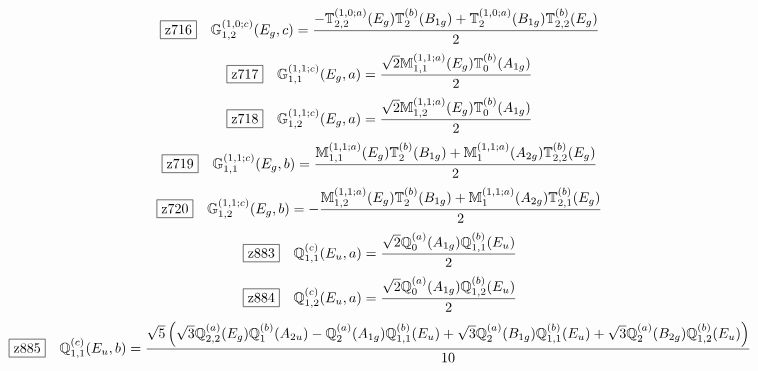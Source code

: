 \documentclass[fleqn,10pt,landscape]{jsarticle}
\begin{document}
\begin{dmath*}
\hspace*{3mm}\fbox{z716}\quad \mathbb{G}_{1,2}^{(1,0;c)}(E_{g},c)=\frac{- \mathbb{T}_{2,2}^{(1,0;a)}(E_{g}) \mathbb{T}_{2}^{(b)}(B_{1g}) + \mathbb{T}_{2}^{(1,0;a)}(B_{1g}) \mathbb{T}_{2,2}^{(b)}(E_{g})}{2}
\end{dmath*}
\begin{dmath*}
\hspace*{3mm}\fbox{z717}\quad \mathbb{G}_{1,1}^{(1,1;c)}(E_{g},a)=\frac{\sqrt{2} \mathbb{M}_{1,1}^{(1,1;a)}(E_{g}) \mathbb{T}_{0}^{(b)}(A_{1g})}{2}
\end{dmath*}
\begin{dmath*}
\hspace*{3mm}\fbox{z718}\quad \mathbb{G}_{1,2}^{(1,1;c)}(E_{g},a)=\frac{\sqrt{2} \mathbb{M}_{1,2}^{(1,1;a)}(E_{g}) \mathbb{T}_{0}^{(b)}(A_{1g})}{2}
\end{dmath*}
\begin{dmath*}
\hspace*{3mm}\fbox{z719}\quad \mathbb{G}_{1,1}^{(1,1;c)}(E_{g},b)=\frac{\mathbb{M}_{1,1}^{(1,1;a)}(E_{g}) \mathbb{T}_{2}^{(b)}(B_{1g}) + \mathbb{M}_{1}^{(1,1;a)}(A_{2g}) \mathbb{T}_{2,2}^{(b)}(E_{g})}{2}
\end{dmath*}
\begin{dmath*}
\hspace*{3mm}\fbox{z720}\quad \mathbb{G}_{1,2}^{(1,1;c)}(E_{g},b)=- \frac{\mathbb{M}_{1,2}^{(1,1;a)}(E_{g}) \mathbb{T}_{2}^{(b)}(B_{1g}) + \mathbb{M}_{1}^{(1,1;a)}(A_{2g}) \mathbb{T}_{2,1}^{(b)}(E_{g})}{2}
\end{dmath*}
\begin{dmath*}
\hspace*{3mm}\fbox{z883}\quad \mathbb{Q}_{1,1}^{(c)}(E_{u},a)=\frac{\sqrt{2} \mathbb{Q}_{0}^{(a)}(A_{1g}) \mathbb{Q}_{1,1}^{(b)}(E_{u})}{2}
\end{dmath*}
\begin{dmath*}
\hspace*{3mm}\fbox{z884}\quad \mathbb{Q}_{1,2}^{(c)}(E_{u},a)=\frac{\sqrt{2} \mathbb{Q}_{0}^{(a)}(A_{1g}) \mathbb{Q}_{1,2}^{(b)}(E_{u})}{2}
\end{dmath*}
\begin{dmath*}
\hspace*{3mm}\fbox{z885}\quad \mathbb{Q}_{1,1}^{(c)}(E_{u},b)=\frac{\sqrt{5} \left(\sqrt{3} \mathbb{Q}_{2,2}^{(a)}(E_{g}) \mathbb{Q}_{1}^{(b)}(A_{2u}) - \mathbb{Q}_{2}^{(a)}(A_{1g}) \mathbb{Q}_{1,1}^{(b)}(E_{u}) + \sqrt{3} \mathbb{Q}_{2}^{(a)}(B_{1g}) \mathbb{Q}_{1,1}^{(b)}(E_{u}) + \sqrt{3} \mathbb{Q}_{2}^{(a)}(B_{2g}) \mathbb{Q}_{1,2}^{(b)}(E_{u})\right)}{10}
\end{dmath*}
\end{document}
